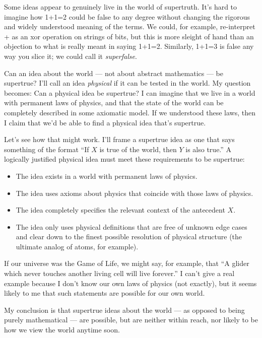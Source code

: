 \documentclass[11pt, oneside]{article}
\theoremstyle{argtstyle}
\begin{document}
Some ideas appear to genuinely live in the world of supertruth. It's hard to
imagine how 1+1=2 could be false to any degree without changing the rigorous and
widely understood meaning of the terms. We could, for example,
re-interpret + as an xor operation on strings of
bits, but this is more sleight of hand than an objection to what is
really meant in saying 1+1=2. Similarly, 1+1=3 is false any way you slice it; we
could call it {\em superfalse}.

Can an idea about the world --- not about abstract mathematics ---
be supertrue?
I'll call an idea {\em physical} if it can be tested in the world.
My question becomes: Can a physical idea be supertrue?
I can imagine that we live in a world with permanent laws of physics, and that
the
state of the world can be completely described in some axiomatic
model.
If we understood these laws, then I claim that we'd be able to find
a physical idea that's supertrue.

Let's see how that might work.
I'll frame a supertrue idea as one that says something of the format ``If $X$ is
true of the world, then $Y$ is also true.''
A logically justified physical idea must meet these
requirements to be supertrue:
\begin{itemize}
    \item The idea exists in a world with permanent laws of physics.
    \item The idea uses axioms about physics that coincide with those laws of
        physics.
    \item The idea completely specifies the relevant context of the antecedent
        $X$.
    \item The idea only uses physical definitions that are free of unknown edge
        cases and clear down to
        the finest possible resolution of physical structure (the
        ultimate analog of atoms, for example).
\end{itemize}
If our universe was the Game of Life, we might say, for example, that
``A glider which never touches another living cell will live forever.''
I can't give a real example because I don't know our own laws of physics (not
exactly), but it
seems likely to me that such statements are possible for our own world.

My conclusion is
that supertrue ideas about the world --- as opposed to being purely
mathematical --- are possible, but are neither within reach,
nor likely to be how we view the world anytime soon.
\end{document}
